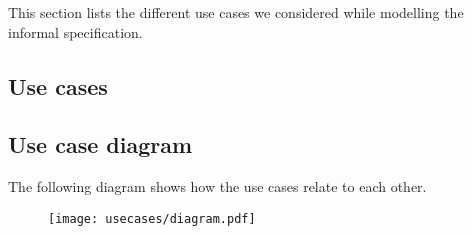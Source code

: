 This section lists the different use cases we considered while modelling the informal specification.
\subsection{Use cases}
	
\subsection{Use case diagram}
	The following diagram shows how the use cases relate to each other.

	\begin{figure}[h]
		\texttt{[image: usecases/diagram.pdf]}
		\label{fig:usecases:diagram}
	\end{figure}

